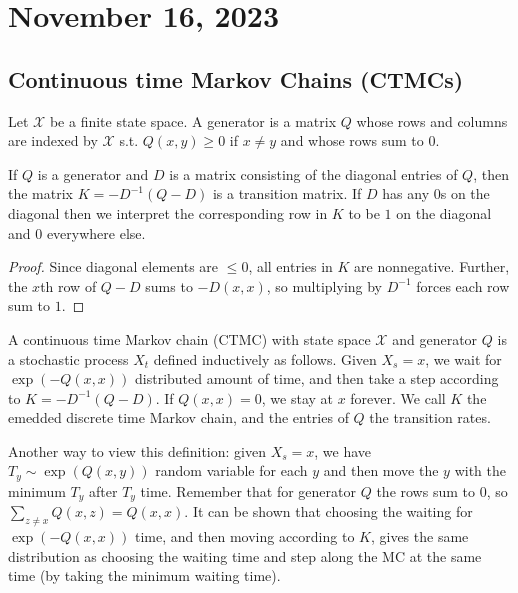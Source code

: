 \section{November 16, 2023}

\subsection{Continuous time Markov Chains (CTMCs)}

\begin{definition}

Let $\mathcal{X}$ be a finite state space. A \ac{generator} is a matrix $Q$ whose rows and columns are indexed by $\mathcal{X}$ s.t. $Q(x,y)\geq 0$ if $x\neq y$ and whose rows sum to $0$. 
\end{definition}

\begin{theorem}
\lemlabel

If $Q$ is a generator and $D$ is a matrix consisting of the diagonal entries of $Q$, then the matrix $K = -D^{-1}(Q-D)$ is a transition matrix. If $D$ has any $0$s on the diagonal then we interpret the corresponding row in $K$ to be $1$ on the diagonal and $0$ everywhere else. 
\end{theorem}

\begin{proof}
	Since diagonal elements are $\leq 0$, all entries in $K$ are nonnegative. Further, the $x$th row of $Q-D$ sums to $-D(x,x)$, so multiplying by $D^{-1}$ forces each row sum to $1$. 
\end{proof}

\begin{definition}

A \ac{continuous time Markov chain} (CTMC) with state space $\mathcal{X}$ and generator $Q$ is a stochastic process $X_t$ defined inductively as follows. Given $X_s=x$, we wait for $\exp(-Q(x,x))$ distributed amount of time, and then take a step according to $K = -D^{-1}(Q-D)$. If $Q(x,x)=0$, we stay at $x$ forever. We call $K$ the \ac{emedded discrete time Markov chain}, and the entries of $Q$ the \ac{transition rates}.
\end{definition}

Another way to view this definition: given $X_s=x$, we have $T_y\sim \exp(Q(x,y))$ random variable for each $y$ and then move the $y$ with the minimum $T_y$ after $T_y$ time. Remember that for generator $Q$ the rows sum to $0$, so $\sum_{z\neq x}Q(x,z) = Q(x,x)$. It can be shown that choosing the waiting for $\exp(-Q(x,x))$ time, and then moving according to $K$, gives the same distribution as choosing the waiting time and step along the MC at the same time (by taking the minimum waiting time). 

